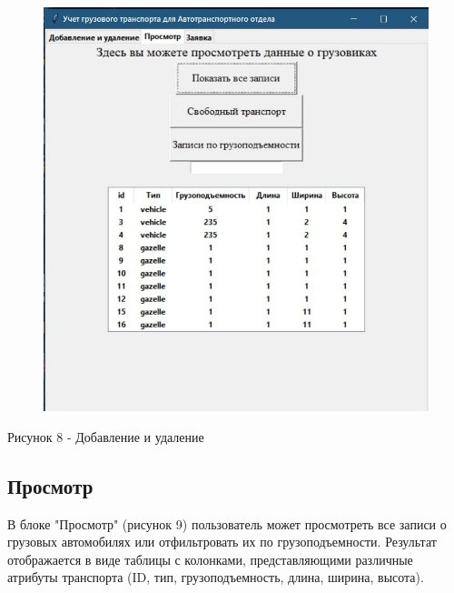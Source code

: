 \documentclass[14pt]{extreport}
\begin{document}
\begin{figure}[H]
    \centering
    \includegraphics[scale=0.7]{2.jpg}
\end{figure}
\begin{center}
    Рисунок 8 - Добавление и удаление 
\end{center}

\subsection{Просмотр}

В блоке "Просмотр" (рисунок 9) пользователь может просмотреть все записи о грузовых автомобилях или отфильтровать их по грузоподъемности. Результат отображается в виде таблицы с колонками, представляющими различные атрибуты транспорта (ID, тип, грузоподъемность, длина, ширина, высота).
\end{document}
